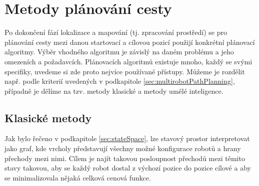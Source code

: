 

\section{Metody plánování cesty}
Po dokončení fází lokalizace a mapování (tj. zpracování prostředí) se pro plánování cesty mezi danou startovací a cílovou pozicí použijí konkrétní plánovací algoritmy. Výběr vhodného algoritmu je závislý na daném problému a jeho omezeních a požadavcích. Plánovacích algoritmů existuje mnoho, každý se svými specifiky, uvedeme si zde proto nejvíce používané přístupy. Můžeme je rozdělit např. podle kriterií uvedených v podkapitole \ref{sec:multirobotPathPlanning}, případně je dělíme na tzv. metody klasické a metody umělé inteligence.

\subsection{Klasické metody}
Jak bylo řečeno v podkapitole \ref{sec:stateSpace}, lze stavový prostor interpretovat jako graf, kde vrcholy představují všechny možné konfigurace robotů a hrany přechody mezi nimi.
Cílem je najít takovou posloupnost přechodů mezi těmito stavy takovou, aby se každý robot dostal z výchozí pozice do pozice cílové a aby se minimalizovala nějaká celková cenová funkce.

